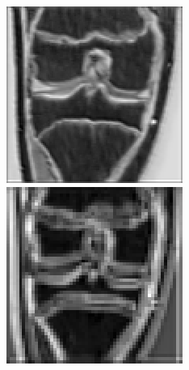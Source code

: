\begin{figure}[H]
\endminipage\hfill
{}%
  \includegraphics[width=\linewidth]{imgs/down2.png}
\endminipage\hfill
{}%
  \includegraphics[width=\linewidth]{imgs/down3.png}

\end{figure}
